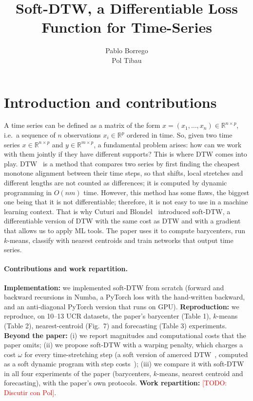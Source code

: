 \documentclass[11pt]{article}
\title{Soft-DTW, a Differentiable Loss Function for Time-Series}
\author{Pablo Borrego \email{pabloalmendralejo@gmail.com} \\ Pol Tibau \email{tibaurubaupol@gmail.com}}
\date{}
\newcommand{\todo}[1]{\textcolor{red}{[TODO: #1]}}
\providecommand{\R}{\mathbb{R}}
\begin{document}
\maketitle
\vspace{-1.5em}

\section{Introduction and contributions}


A time series can be defined as a matrix of the form $x=(x_1,\dots,x_n)\in\R^{n\times p}$, i.e.\ a sequence of $n$ observations $x_i\in\R^p$ ordered in time. So, given two time series $x\in\R^{n\times p}$ and $y\in\R^{m\times p}$, a fundamental problem arises: how can we work with them jointly if they have different supports? This is where DTW comes into play. DTW~\cite{sakoe1978dynamic} is a method that compares two series by first finding the cheapest monotone alignment between their time steps, so that shifts, local stretches and different lengths are not counted as differences; it is computed by dynamic programming in $O(nm)$ time. However, this method has some flaws, the biggest one being that it is not differentiable; therefore, it is not easy to use in a machine learning context. That is why Cuturi and Blondel~\cite{cuturi2017soft} introduced soft-DTW, a differentiable version of DTW with the same cost as DTW and with a gradient that allows us to apply ML tools. The paper uses it to compute barycenters, run $k$-means, classify with nearest centroids and train networks that output time series. 


\paragraph{Contributions and work repartition.}
\textbf{Implementation:} we implemented soft-DTW from scratch (forward and backward recursions in Numba, a PyTorch loss with the hand-written backward, and an anti-diagonal PyTorch version that runs on GPU).
\textbf{Reproduction:} we reproduce, on 10--13 UCR datasets, the paper's barycenter (Table 1), $k$-means (Table 2), nearest-centroid (Fig.~7) and forecasting (Table 3) experiments.
\textbf{Beyond the paper:} (i) we report magnitudes and computational costs that the paper omits; (ii) we propose soft-DTW with a warping penalty, which charges a cost $\omega$ for every time-stretching step (a soft version of amerced DTW~\cite{herrmann2023amercing}, computed as a soft dynamic program with step costs~\cite{mensch2018differentiable}); (iii) we compare it with soft-DTW in all four experiments of the paper (barycenters, $k$-means, nearest centroid and forecasting), with the paper's own protocols.
\textbf{Work repartition:} \todo{Discutir con Pol}.
\end{document}
